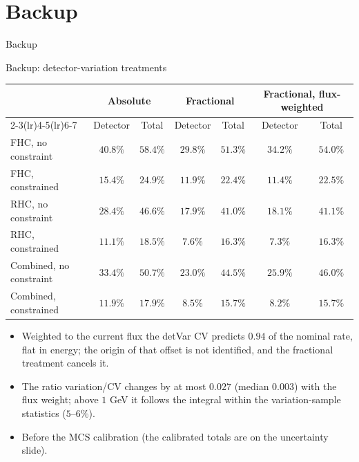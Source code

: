\documentclass[aspectratio=169,10pt]{beamer}
\newif\ifbackup
\begin{document}
\backuptrue
\appendix
\section*{Backup}

{
\begin{frame}[plain]
  \begin{center}\Huge\color{ubred} Backup\end{center}
\end{frame}}

\begin{frame}{Backup: detector-variation treatments}
  \small
  \begin{center}\setlength{\tabcolsep}{4pt}
  \begin{tabular}{lcccccc}
    \toprule
    & \multicolumn{2}{c}{Absolute} & \multicolumn{2}{c}{Fractional} & \multicolumn{2}{c}{Fractional, flux-weighted} \\
    \cmidrule(lr){2-3}\cmidrule(lr){4-5}\cmidrule(lr){6-7}
    & Detector & Total & Detector & Total & Detector & Total \\
    \midrule
    FHC, no constraint       & $40.8\%$ & $58.4\%$ & $29.8\%$ & $51.3\%$ & $34.2\%$ & $54.0\%$ \\
    FHC, constrained         & $15.4\%$ & $24.9\%$ & $11.9\%$ & $22.4\%$ & $11.4\%$ & $22.5\%$ \\
    RHC, no constraint       & $28.4\%$ & $46.6\%$ & $17.9\%$ & $41.0\%$ & $18.1\%$ & $41.1\%$ \\
    RHC, constrained         & $11.1\%$ & $18.5\%$ & $7.6\%$  & $16.3\%$ & $7.3\%$  & $16.3\%$ \\
    Combined, no constraint  & $33.4\%$ & $50.7\%$ & $23.0\%$ & $44.5\%$ & $25.9\%$ & $46.0\%$ \\
    Combined, constrained    & $11.9\%$ & $17.9\%$ & $8.5\%$  & $15.7\%$ & $8.2\%$  & $15.7\%$ \\
    \bottomrule
  \end{tabular}
  \end{center}
  \begin{itemize}\footnotesize\setlength\itemsep{2pt}
    \item Weighted to the current flux the detVar CV predicts $0.94$ of the nominal rate, flat in energy; the
          origin of that offset is not identified, and the fractional treatment cancels it.
    \item The ratio variation/CV changes by at most $0.027$ (median $0.003$) with the flux weight; above
          $1$ GeV it follows the integral within the variation-sample statistics ($5$--$6\%$).
    \item Before the MCS calibration (the calibrated totals are on the uncertainty slide).
  \end{itemize}
\end{frame}
\end{document}
